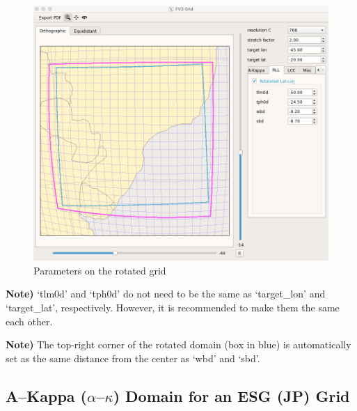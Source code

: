 \documentclass[11pt,fleqn]{report}              %
\begin{document}
\begin{enumerate}
\begin{figure}[ht!]
  \centering
  \includegraphics[width=0.6\linewidth]{post_fv3grid_rll.png}
  \caption{Parameters on the rotated grid}
  \label{fig:post_fv3grid_rll}
\end{figure}

{\bf Note)} `tlm0d' and `tph0d' do not need to be the same as `target\_lon' and `target\_lat', respectively. However, it is recommended to make them the same each other.

{\bf Note)} The top-right corner of the rotated domain (box in blue) is automatically set as the same distance from the center as `wbd' and `sbd'.


\end{enumerate}


\subsection{A--Kappa ($\alpha$--$\kappa$) Domain for an ESG (JP) Grid}
\label{subsec:fv3grid_esg_jp}
\end{document}
